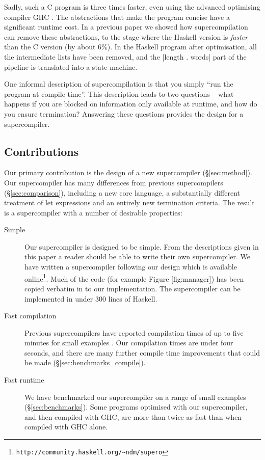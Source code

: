\documentclass[draft]{sigplanconf}
\begin{document}
Sadly, such a C program is three times faster, even using the advanced optimising compiler GHC \cite{ghc6_12}. The abstractions that make the program concise have a significant runtime cost. In a previous paper \cite{me:supero} we showed how supercompilation can remove these abstractions, to the stage where the Haskell version is \textit{faster} than the C version (by about 6\%). In the Haskell program after optimisation, all the intermediate lists have been removed, and the |length . words| part of the pipeline is translated into a state machine.

One informal description of supercompilation is that you simply ``run the program at compile time''. This description leads to two questions -- what happens if you are blocked on information only available at runtime, and how do you ensure termination? Answering these questions provides the design for a supercompiler.

\subsection{Contributions}

Our primary contribution is the design of a new supercompiler (\S\ref{sec:method}). Our supercompiler has many differences from previous supercompilers (\S\ref{sec:comparison}), including a new core language, a substantially different treatment of let expressions and an entirely new termination criteria. The result is a supercompiler with a number of desirable properties:

\begin{description}
\item[Simple] Our supercompiler is designed to be simple. From the descriptions given in this paper a reader should be able to write their own supercompiler. We have written a supercompiler following our design which is available online\footnote{\verb"http://community.haskell.org/~ndm/supero"}. Much of the code (for example Figure \ref{fig:manager}) has been copied verbatim in to our implementation. The supercompiler can be implemented in under 300 lines of Haskell.
\item[Fast compilation] Previous supercompilers have reported compilation times of up to five minutes for small examples \cite{me:supero}. Our compilation times are under four seconds, and there are many further compile time improvements that could be made (\S\ref{sec:benchmarks_compile}).
\item[Fast runtime] We have benchmarked our supercompiler on a range of small examples (\S\ref{sec:benchmarks}). Some programs optimised with our supercompiler, and then compiled with GHC, are more than twice as fast than when compiled with GHC alone.
\end{description}
\end{document}
